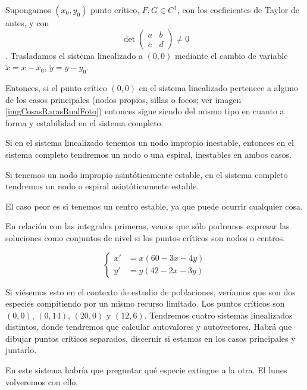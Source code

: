\begin{theorem} Supongamos $(x_0, y_0)$ punto crítico, $F, G∈C^1$, con los coeficientes de Taylor de antes, y con \[ \det \begin{pmatrix}
a & b \\ c & d
\end{pmatrix} ≠ 0 \]. Trasladamos el sistema linealizado a $(0,0)$ mediante el cambio de variable $\tilde{x} = x - x_0$, $\tilde{y}= y-y_0$. 

Entonces, si el punto crítico $(0,0)$ en el sistema linealizado pertenece a alguno de los casos principales (nodos propios, sillas o focos; ver imagen \ref{imgCosasRarasRualFoto}) entonces sigue siendo del mismo tipo en cuanto a forma y estabilidad en el sistema completo.

Si en el sistema linealizado tenemos un nodo impropio inestable, entonces en el sistema completo tendremos un nodo o una espiral, inestables en ambos casos.

Si tenemos un nodo impropio asintóticamente estable, en el sistema completo tendremos un nodo o espiral asintóticamente estable.

El caso peor es  si tenemos un centro estable, ya que puede ocurrir cualquier cosa.
\end{theorem}

En relación con las integrales primeras, vemos que sólo podremos expresar las soluciones como conjuntos de nivel si los puntos críticos son nodos o centros.

\begin{example}
\[\begin{cases}
x' &= x(60-3x-4y) \\
y' &= y(42-2x-3y)
\end{cases} \]

Si viésemos esto en el contexto de estudio de poblaciones, veríamos que son dos especies compitiendo por un mismo recurso limitado. Los puntos críticos son $(0,0)$, $\left(0, 14\right)$, $(20, 0)$ y $(12, 6)$. Tendremos cuatro sistemas linealizados distintos, donde tendremos que calcular autovalores y autovectores. Habrá que dibujar puntos críticos separados, discernir si estamos en los casos principales y juntarlo.

En este sistema habría que preguntar qué especie extingue a la otra. El lunes volveremos con ello.
\end{example}